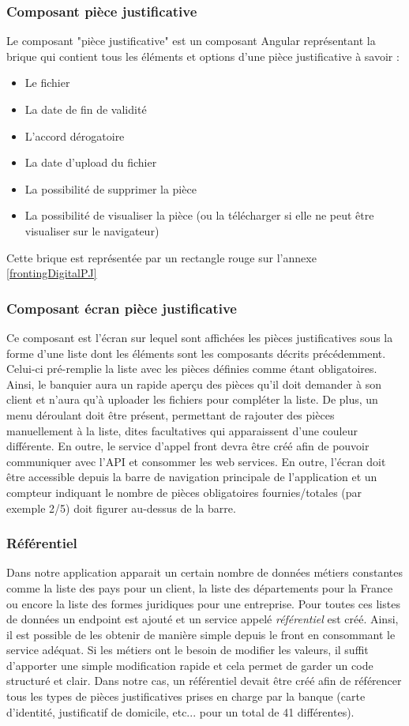 	\subsubsection{Composant pièce justificative}
	Le composant "pièce justificative" est un composant Angular représentant la brique qui contient tous les éléments et options d'une pièce justificative à savoir :
	\begin{itemize}
		\item Le fichier
		\item La date de fin de validité
		\item L'accord dérogatoire
		\item La date d'upload du fichier
		\item La possibilité de supprimer la pièce
		\item La possibilité de visualiser la pièce (ou la télécharger si elle ne peut être visualiser sur le navigateur)
	\end{itemize}
	Cette brique est représentée par un rectangle rouge sur l'annexe \ref{frontingDigitalPJ}
	
	\subsubsection{Composant écran pièce justificative}
	Ce composant est l'écran sur lequel sont affichées les pièces justificatives sous la forme d'une liste dont les éléments sont les composants décrits précédemment. Celui-ci pré-remplie la liste avec les pièces définies comme étant obligatoires. Ainsi, le banquier aura un rapide aperçu des pièces qu'il doit demander à son client et n'aura qu'à uploader les fichiers pour compléter la liste. De plus, un menu déroulant doit être présent, permettant de rajouter des pièces manuellement à la liste, dites facultatives qui apparaissent d'une couleur différente. En outre, le service d'appel front devra être créé afin de pouvoir communiquer avec l'API et consommer les web services. En outre, l'écran doit être accessible depuis la barre de navigation principale de l'application et un compteur indiquant le nombre de pièces obligatoires fournies/totales (par exemple 2/5) doit figurer au-dessus de la barre.
	
	\subsubsection{Référentiel}
	Dans notre application apparait un certain nombre de données métiers constantes comme la liste des pays pour un client, la liste des départements pour la France ou encore la liste des formes juridiques pour une entreprise. Pour toutes ces listes de données un endpoint est ajouté et un service appelé \textit{référentiel} est créé. Ainsi, il est possible de les obtenir de manière simple depuis le front en consommant le service adéquat. Si les métiers ont le besoin de modifier les valeurs, il suffit d'apporter une simple modification rapide et cela permet de garder un code structuré et clair. Dans notre cas, un référentiel devait être créé afin de référencer tous les types de pièces justificatives prises en charge par la banque (carte d'identité, justificatif de domicile, etc... pour un total de 41 différentes).	
	
